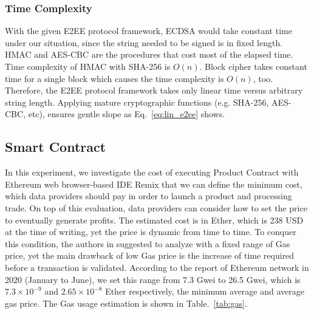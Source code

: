 \begin{spacing}{2.0}
\subsubsection{Time Complexity}
With the given E2EE protocol framework, ECDSA would take constant time under our situation, since the string needed to be signed is in fixed length. HMAC and AES-CBC are the procedures that cost most of the elapsed time. Time complexity of HMAC with SHA-256 is $O(n)$.\cite{hmac_time_complexity} Block cipher takes constant time for a single block which causes the time complexity is $O(n)$, too. Therefore, the E2EE protocol framework takes only linear time versus arbitrary string length. Applying mature cryptographic functions (e.g. SHA-256, AES-CBC, etc), ensures gentle slope as Eq.~\ref{eq:lin_e2ee} shows.
\clearpage

\subsection{Smart Contract}
In this experiment, we investigate the cost of executing Product Contract with Ethereum web browser-based IDE Remix that we can define the minimum cost, which data providers should pay in order to launch a product and processing trade.  On top of this evaluation, data providers can consider how to set the price to eventually generate profits. The estimated cost is in Ether, which is 238 USD at the time of writing, yet the price is dynamic from time to time. To conquer this condition, the authors in \cite{MindMyValue} suggested to analyze with a fixed range of Gas price,  yet the main drawback of low Gas price is the increase of time required before a transaction is validated. According to the report of Ethereum network\cite{ethereumChart} in 2020 (January to June), we set this range from 7.3 Gwei to 26.5 Gwei, which is $7.3 \times 10^{-9}$ and $2.65 \times 10^{-8}$ Ether respectively, the minimum average and average gas price. The Gas usage estimation is shown in Table.~\ref{tab:gas}.


\end{spacing}
